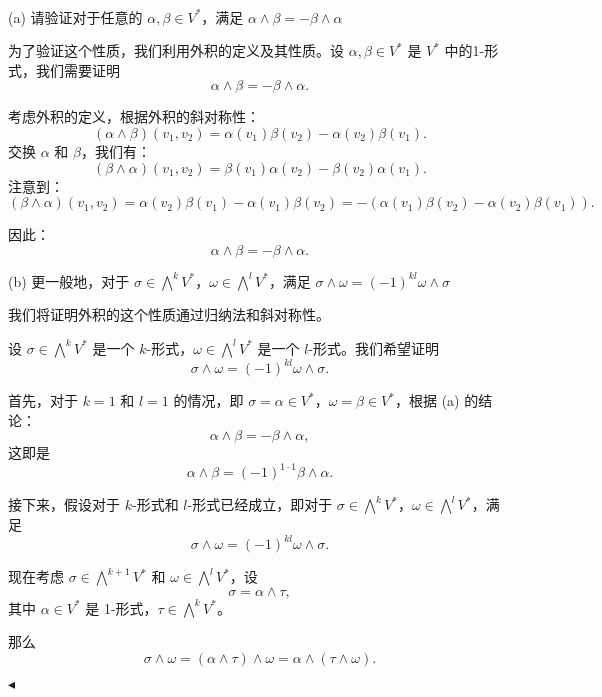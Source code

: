 \documentclass[11pt]{article}
\newenvironment{question}[2][Question]{\begin{trivlist}
\item[\hskip \labelsep {\bfseries #1}\hskip \labelsep {\bfseries #2.}]}{\hfill$\blacktriangleleft$\end{trivlist}}
\begin{document}
    
    \begin{question}{3 (15') (外积)}~\\

     (a) 请验证对于任意的 \(\alpha, \beta \in V^*\)，满足 \(\alpha \wedge \beta = -\beta \wedge \alpha\)
    
    为了验证这个性质，我们利用外积的定义及其性质。设 \(\alpha, \beta \in V^*\) 是 \(V^*\) 中的1-形式，我们需要证明
    \[
    \alpha \wedge \beta = -\beta \wedge \alpha.
    \]
    
    考虑外积的定义，根据外积的斜对称性：
    \[
    (\alpha \wedge \beta)(v_1, v_2) = \alpha(v_1) \beta(v_2) - \alpha(v_2) \beta(v_1).
    \]
    交换 \(\alpha\) 和 \(\beta\)，我们有：
    \[
    (\beta \wedge \alpha)(v_1, v_2) = \beta(v_1) \alpha(v_2) - \beta(v_2) \alpha(v_1).
    \]
    注意到：
    \[
    (\beta \wedge \alpha)(v_1, v_2) = \alpha(v_2) \beta(v_1) - \alpha(v_1) \beta(v_2) = -(\alpha(v_1) \beta(v_2) - \alpha(v_2) \beta(v_1)).
    \]
    
    因此：
    \[
    \alpha \wedge \beta = -\beta \wedge \alpha.
    \]
    
     (b) 更一般地，对于 \(\sigma \in \bigwedge^k V^*\)，\(\omega \in \bigwedge^l V^*\)，满足 \(\sigma \wedge \omega = (-1)^{kl} \omega \wedge \sigma\)
    
    我们将证明外积的这个性质通过归纳法和斜对称性。
    
    设 \(\sigma \in \bigwedge^k V^*\) 是一个 \(k\)-形式，\(\omega \in \bigwedge^l V^*\) 是一个 \(l\)-形式。我们希望证明
    \[
    \sigma \wedge \omega = (-1)^{kl} \omega \wedge \sigma.
    \]
    
    首先，对于 \(k = 1\) 和 \(l = 1\) 的情况，即 \(\sigma = \alpha \in V^*\)，\(\omega = \beta \in V^*\)，根据 (a) 的结论：
    \[
    \alpha \wedge \beta = -\beta \wedge \alpha,
    \]
    这即是
    \[
    \alpha \wedge \beta = (-1)^{1 \cdot 1} \beta \wedge \alpha.
    \]
    
    接下来，假设对于 \(k\)-形式和 \(l\)-形式已经成立，即对于 \(\sigma \in \bigwedge^k V^*\)，\(\omega \in \bigwedge^l V^*\)，满足
    \[
    \sigma \wedge \omega = (-1)^{kl} \omega \wedge \sigma.
    \]
    
    现在考虑 \(\sigma \in \bigwedge^{k+1} V^*\) 和 \(\omega \in \bigwedge^l V^*\)，设
    \[
    \sigma = \alpha \wedge \tau,
    \]
    其中 \(\alpha \in V^*\) 是 1-形式，\(\tau \in \bigwedge^k V^*\)。
    
    那么
    \[
    \sigma \wedge \omega = (\alpha \wedge \tau) \wedge \omega = \alpha \wedge (\tau \wedge \omega).
    \]
    

\end{question}
\end{document}
